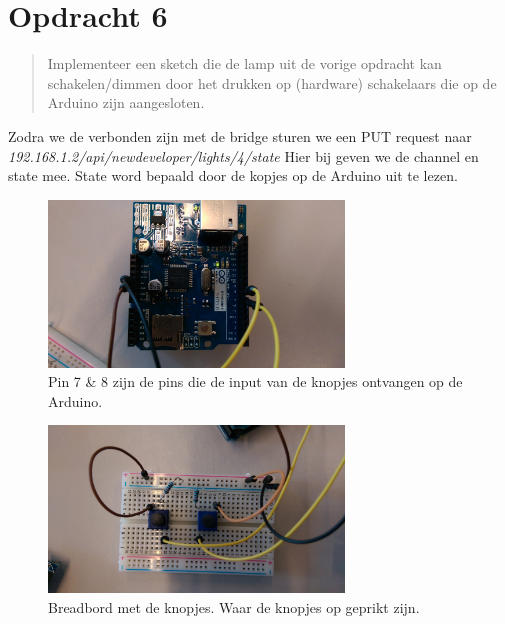 \documentclass[12pt]{article}
\begin{document}
\section*{Opdracht 6}
\begin{quote}
Implementeer een sketch die de lamp uit de vorige opdracht kan schakelen/dimmen door het drukken
op (hardware) schakelaars die op de Arduino zijn aangesloten.
\end{quote}
Zodra we de verbonden zijn met de bridge sturen we een PUT request naar \\\textit{192.168.1.2/api/newdeveloper/lights/4/state} Hier bij geven we de channel en state mee. State word bepaald door de kopjes op de Arduino uit te lezen. 
\begin{figure}[h!]
  \centering
      \includegraphics[width=0.7\textwidth]{IMAG0046}
  \caption{Pin 7 \& 8 zijn de pins die de input van de knopjes ontvangen op de Arduino.}
\end{figure}
\begin{figure}[h!]
  \centering
      \includegraphics[width=0.7\textwidth]{IMAG0048}
  \caption{Breadbord met de knopjes. Waar de knopjes op geprikt zijn.}
\end{figure}
\newpage

\end{document}
